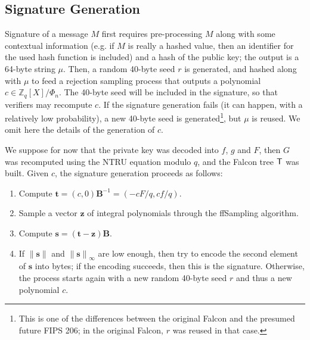 \documentclass{llncs}
\newcommand{\bZ}{\mathbb{Z}}
\newcommand{\norm}[1]{\left\|#1\right\|}
\newcommand{\norminf}[1]{\norm{#1}_{\infty}}
\begin{document}
\subsection{Signature Generation}

Signature of a message $M$ first requires pre-processing $M$ along with
some contextual information (e.g. if $M$ is really a hashed value, then
an identifier for the used hash function is included) and a hash of the
public key; the output is a 64-byte string $\mu$. Then, a random 40-byte
seed $r$ is generated, and hashed along with $\mu$ to feed a rejection
sampling process that outputs a polynomial $c\in\bZ_q[X]/\Phi_n$. The
40-byte seed will be included in the signature, so that verifiers may
recompute $c$. If the signature generation fails (it can happen, with a
relatively low probability), a new 40-byte seed is
generated\footnote{This is one of the differences between the original
Falcon\cite{FalconRound3} and the presumed future FIPS 206; in the
original Falcon, $r$ was reused in that case.}, but $\mu$ is reused. We
omit here the details of the generation of $c$.

We suppose for now that the private key was decoded into $f$, $g$ and
$F$, then $G$ was recomputed using the NTRU equation modulo $q$, and
the Falcon tree $\text{\textsf{T}}$ was built. Given $c$, the signature
generation proceeds as follows:
\begin{enumerate}
    \item Compute $\mathbf{t} = (c, 0) \mathbf{B}^{-1} = (-cF/q, cf/q)$.

    \item Sample a vector $\mathbf{z}$ of integral polynomials
    through the \textsf{ffSampling} algorithm.

    \item Compute $\mathbf{s} = (\mathbf{t} - \mathbf{z}) \mathbf{B}$.

    \item If $\norm{\mathbf{s}}$ and $\norminf{\mathbf{s}}$ are low
    enough, then try to encode the second element of $\mathbf{s}$
    into bytes; if the encoding succeeds, then this is the signature.
    Otherwise, the process starts again with a new random 40-byte seed
    $r$ and thus a new polynomial $c$.

\end{enumerate}
\end{document}
